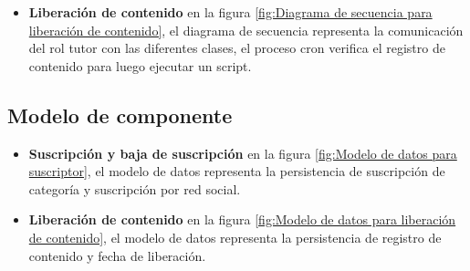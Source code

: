 \begin{itemize}
\begin{minipage}{1.0\textwidth}
	\centering
	\label{fig:Diagrama de secuencia para suscripción}
\end{minipage}

\item \textbf{Liberación de contenido}
en la figura \ref{fig:Diagrama de secuencia para liberación de contenido},
el diagrama de secuencia representa la comunicación del rol tutor con las
diferentes clases, el proceso cron verifica el registro de contenido para
luego ejecutar un script.

\begin{minipage}{1.0\textwidth}
	\centering
	\label{fig:Diagrama de secuencia para liberación de contenido}
\end{minipage}

\end{itemize}

\subsection{Modelo de componente}

\begin{itemize}

\item \textbf{Suscripción y baja de suscripción}
en la figura \ref{fig:Modelo de datos para suscriptor}, el modelo de datos
representa la persistencia de suscripción de categoría y suscripción por
red social.

\begin{minipage}{1.0\textwidth}
	\centering
	\label{fig:Modelo de datos para suscriptor}
\end{minipage}

\item \textbf{Liberación de contenido}
en la figura \ref{fig:Modelo de datos para liberación de contenido},
el modelo de datos representa la persistencia de registro de contenido
y fecha de liberación.

\begin{minipage}{1.0\textwidth}
	\centering
	\label{fig:Modelo de datos para liberación de contenido}
\end{minipage}

\end{itemize}

